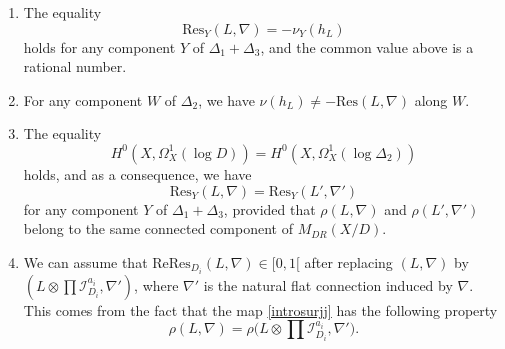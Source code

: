 \documentclass[english]{amsart}
\newcommand{\Rel}{\mathrm{Re}}
\newcommand{\Res}{\mathrm{Res}}
\numberwithin{equation}{thm}
\begin{document}
\begin{enumerate}
\smallskip

\item[\rm (1)] The equality 
\[
\Res_{Y}(L,\nabla) = -\nu_{Y}(h_L)
\]
holds for any component $Y$ of $\Delta_1 + \Delta_3$, and the common value above is a rational number.
\smallskip

\item[\rm (2)] For any component $W$ of $\Delta_2$, we have $\nu(h_L) \neq -\Res(L,\nabla)$ along $W$. 
\smallskip

\item[\rm (3)] The equality \[H^0(X, \Omega_X^1(\log D))= H^0(X, \Omega_X^1(\log \Delta_2))\] 
holds, and as a consequence, we have 
\[\Res_{Y}(L,\nabla) = \Res_{Y}(L',\nabla')\]
for any component $Y$ of $\Delta_1 + \Delta_3$, provided that $\rho(L,\nabla)$ and $\rho(L',\nabla')$ belong to the same connected component of  $M_{DR}(X/D)$.
\smallskip

\item[\rm (4)] We can assume that $\Rel  \Res_{D_i}(L,\nabla) \in [0,1[$ after replacing $(L,\nabla)$ by 
$(L \otimes \textstyle\prod \mathcal{I}_{D_i}^{a_i}, \nabla' )$, where $\nabla' $ is the natural flat connection induced by $\nabla$. This comes from the fact that 
the map \eqref{introsurjj} has the following property 
\[
	\rho(L,\nabla)
	=
	\rho\bigl(L \otimes \textstyle\prod \mathcal{I}_{D_i}^{a_i}, \nabla'\bigr).
\]
\end{enumerate}




\end{document}
